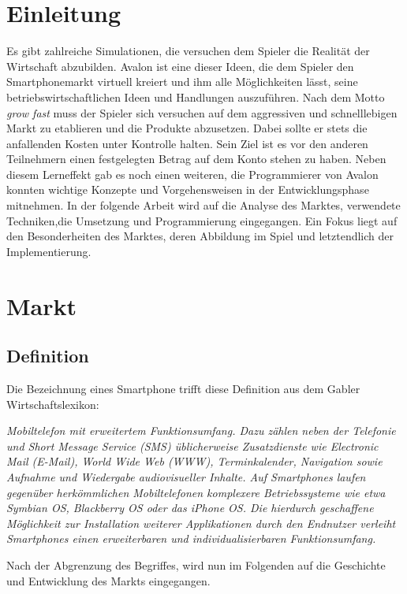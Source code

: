 
\chapter{Einleitung}
Es gibt zahlreiche Simulationen, die versuchen dem Spieler die Realität der Wirtschaft abzubilden. Avalon ist eine dieser Ideen, die dem Spieler den Smartphonemarkt virtuell kreiert und ihm alle Möglichkeiten lässt, seine betriebswirtschaftlichen Ideen und Handlungen auszuführen. Nach dem Motto \textit{grow fast} muss der Spieler sich versuchen auf dem aggressiven und schnelllebigen Markt zu etablieren und die Produkte abzusetzen. Dabei sollte er stets die anfallenden Kosten unter Kontrolle halten. Sein Ziel ist es vor den anderen Teilnehmern einen festgelegten Betrag auf dem Konto stehen zu haben. Neben diesem Lerneffekt gab es noch einen weiteren, die Programmierer von Avalon konnten wichtige Konzepte und Vorgehensweisen in  der Entwicklungsphase mitnehmen. In der folgende Arbeit wird auf die Analyse des Marktes, verwendete Techniken,die Umsetzung und Programmierung eingegangen. Ein Fokus liegt auf den Besonderheiten des Marktes, deren Abbildung im Spiel und letztendlich der Implementierung.
\chapter{Markt}

\section{Definition}

Die Bezeichnung eines Smartphone trifft diese Definition aus dem Gabler Wirtschaftslexikon:

\textit{Mobiltelefon mit erweitertem Funktionsumfang. Dazu zählen neben der Telefonie und Short Message Service (SMS) üblicherweise Zusatzdienste wie Electronic Mail (E-Mail), World Wide Web (WWW), Terminkalender, Navigation sowie Aufnahme und Wiedergabe audiovisueller Inhalte. Auf Smartphones laufen gegenüber herkömmlichen Mobiltelefonen komplexere Betriebssysteme wie etwa Symbian OS, Blackberry OS oder das iPhone OS. Die hierdurch geschaffene Möglichkeit zur Installation weiterer Applikationen durch den Endnutzer verleiht Smartphones einen erweiterbaren und individualisierbaren Funktionsumfang.}

Nach der Abgrenzung des Begriffes, wird nun im Folgenden auf die Geschichte und Entwicklung des Markts eingegangen.


